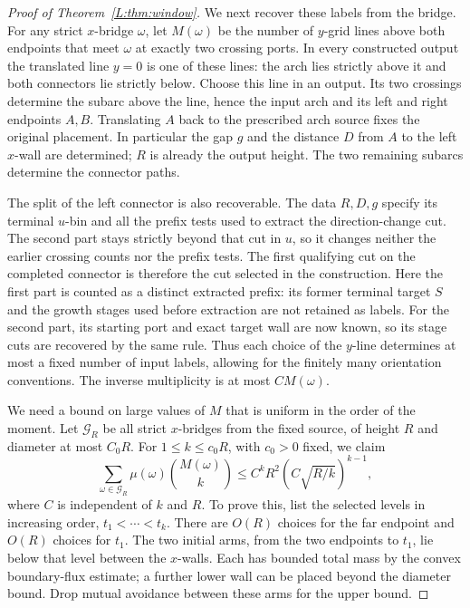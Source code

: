 \documentclass[11pt]{article}
\numberwithin{equation}{section}
\theoremstyle{definition}\newtheorem{definition}[theorem]{Definition}
\theoremstyle{remark}\newtheorem{remark}[theorem]{Remark}
\begin{document}
\begin{proof}[Proof of Theorem~\ref{L:thm:window}]
We next recover these labels from the bridge. For any strict $x$-bridge
$\omega$, let $M(\omega)$ be the number of $y$-grid lines above both
endpoints that meet $\omega$ at exactly two crossing ports. In every
constructed output the translated line $y=0$ is one of these lines:
the arch lies strictly above it and both connectors lie strictly below.
Choose this line in an output. Its two crossings determine the subarc
above the line, hence the input arch and its left and right endpoints
$A,B$. Translating $A$ back to the prescribed arch source fixes the
original placement. In particular the gap $g$ and the distance $D$
from $A$ to the left $x$-wall are determined; $R$ is already the output
height. The two remaining subarcs determine the connector paths.

The split of the left connector is also recoverable. The data $R,D,g$
specify its terminal $u$-bin and all the prefix tests used to extract
the direction-change cut. The second part stays strictly beyond that
cut in $u$, so it changes neither the earlier crossing counts nor the
prefix tests. The first qualifying cut on the completed connector is
therefore the cut selected in the construction. Here the first part
is counted as a distinct extracted prefix: its former terminal target
$S$ and the growth stages used before extraction are not retained as
labels. For the second part, its starting port and exact target wall
are now known, so its stage cuts are recovered by the same rule.
Thus each choice of the $y$-line determines at most a fixed number of
input labels, allowing for the finitely many orientation conventions.
The inverse multiplicity is at most $C M(\omega)$.

We need a bound on large values of $M$ that is uniform in the order of
the moment. Let $\mathcal G_R$ be all strict $x$-bridges from the fixed
source, of height $R$ and diameter at most $C_0R$. For
$1\le k\le c_0R$, with $c_0>0$ fixed, we claim
\begin{equation}
 \sum_{\omega\in\mathcal G_R}\mu(\omega)
       \binom{M(\omega)}{k}
 \le C^kR^2\left(C\sqrt{R/k}\right)^{k-1},
 \label{L:eq:double-cut-factorial}
\end{equation}
where $C$ is independent of $k$ and $R$.
To prove this, list the selected levels in increasing order,
$t_1<\cdots<t_k$. There are $O(R)$ choices for the far endpoint and
$O(R)$ choices for $t_1$. The two initial arms, from the two endpoints
to $t_1$, lie below that level between the $x$-walls. Each has bounded
total mass by the convex boundary-flux estimate; a further lower wall
can be placed beyond the diameter bound. Drop mutual avoidance between
these arms for the upper bound.


\end{proof}
\end{document}
